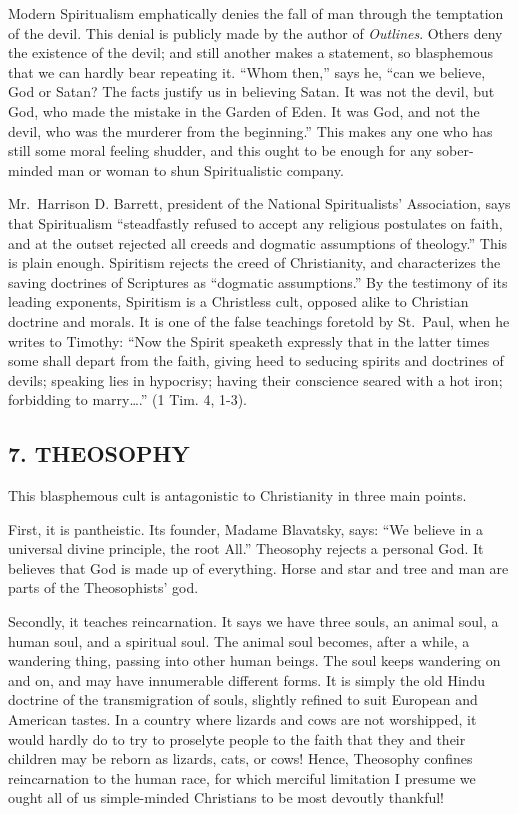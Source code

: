 \documentclass[
]{book}
\begin{document}
Modern Spiritualism emphatically denies the fall of man through the temptation of the devil. This denial is publicly made by the author of \emph{Outlines}. Others deny the existence of the devil; and still another makes a statement, so blasphemous that we can hardly bear repeating it. ``Whom then,'' says he, ``can we believe, God or Satan? The facts justify us in believing Satan. It was not the devil, but God, who made the mistake in the Garden of Eden. It was God, and not the devil, who was the murderer from the beginning.'' This makes any one who has still some moral feeling shudder, and this ought to be enough for any sober-minded man or woman to shun Spiritualistic company.

Mr.~Harrison D. Barrett, president of the National Spiritualists' Association, says that Spiritualism ``steadfastly refused to accept any religious postulates on faith, and at the outset rejected all creeds and dogmatic assumptions of theology.'' This is plain enough. Spiritism rejects the creed of Christianity, and characterizes the saving doctrines of Scriptures as ``dogmatic assumptions.'' By the testimony of its leading exponents, Spiritism is a Christless cult, opposed alike to Christian doctrine and morals. It is one of the false teachings foretold by St.~Paul, when he writes to Timothy: ``Now the Spirit speaketh expressly that in the latter times some shall depart from the faith, giving heed to seducing spirits and doctrines of devils; speaking lies in hypocrisy; having their conscience seared with a hot iron; forbidding to marry\ldots.'' (1 Tim. 4, 1-3).

\subsection*{\texorpdfstring{7. THEOSOPHY}{7. THEOSOPHY}}\label{theosophy}

This blasphemous cult is antagonistic to Christianity in three main points.

First, it is pantheistic. Its founder, Madame Blavatsky, says: ``We believe in a universal divine principle, the root All.'' Theosophy rejects a personal God. It believes that God is made up of everything. Horse and star and tree and man are parts of the Theosophists' god.

Secondly, it teaches reincarnation. It says we have three souls, an animal soul, a human soul, and a spiritual soul. The animal soul becomes, after a while, a wandering thing, passing into other human beings. The soul keeps wandering on and on, and may have innumerable different forms. It is simply the old Hindu doctrine of the transmigration of souls, slightly refined to suit European and American tastes. In a country where lizards and cows are not worshipped, it would hardly do to try to proselyte people to the faith that they and their children may be reborn as lizards, cats, or cows! Hence, Theosophy confines reincarnation to the human race, for which merciful limitation I presume we ought all of us simple-minded Christians to be most devoutly thankful!
\end{document}
